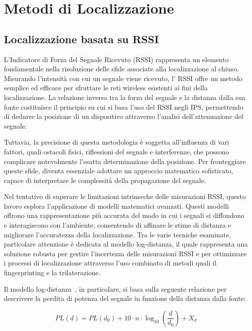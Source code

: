 \section{Metodi di Localizzazione}
\subsection{Localizzazione basata su RSSI}
\hspace{\parindent}L'Indicatore di Forza del Segnale Ricevuto (RSSI) rappresenta un elemento fondamentale nella risoluzione delle sfide associate alla localizzazione al chiuso. Misurando l'intensità con cui un segnale viene ricevuto, l' RSSI offre un metodo semplice ed efficace per sfruttare le reti wireless esistenti ai fini della localizzazione. La relazione inversa tra la forza del segnale e la distanza dalla sua fonte costituisce il principio su cui si basa l'uso del RSSI negli IPS, permettendo di dedurre la posizione di un dispositivo attraverso l'analisi dell'attenuazione del segnale.

Tuttavia, la precisione di questa metodologia è soggetta all'influenza di vari fattori, quali ostacoli fisici, riflessioni del segnale e interferenze, che possono complicare notevolmente l'esatta determinazione della posizione. Per fronteggiare queste sfide, diventa essenziale adottare un approccio matematico sofisticato, capace di interpretare le complessità della propagazione del segnale.

Nel tentativo di superare le limitazioni intrinseche delle misurazioni RSSI, questo lavoro esplora l'applicazione di modelli matematici avanzati. Questi modelli offrono una rappresentazione più accurata del modo in cui i segnali si diffondono e interagiscono con l'ambiente, consentendo di affinare le stime di distanza e migliorare l'accuratezza della localizzazione. Tra le varie tecniche esaminate, particolare attenzione è dedicata al modello log-distanza, il quale rappresenta una soluzione robusta per gestire l'incertezza delle misurazioni RSSI e per ottimizzare i processi di localizzazione attraverso l'uso combinato di metodi quali il fingerprinting e la trilaterazione.

Il modello log-distanza~\cite{Mazuelas2009RobustIndoor}, in particolare, si basa sulla seguente relazione per descrivere la perdita di potenza del segnale in funzione della distanza dalla fonte:

\begin{equation}
    PL(d) = PL(d_0) + 10 \cdot n \cdot \log_{10}\left(\frac{d}{d_0}\right) + X_{\sigma}
\end{equation}

